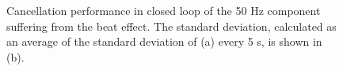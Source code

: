 \begin{figure}[h!]
  \centering %
  \qquad
  \caption{\label{fig:beateffect} Cancellation performance in closed loop of the 50 Hz component suffering from the beat effect. The standard deviation, calculated as an average of the standard deviation of (a) every 5 s, is shown in (b).}
\end{figure}


